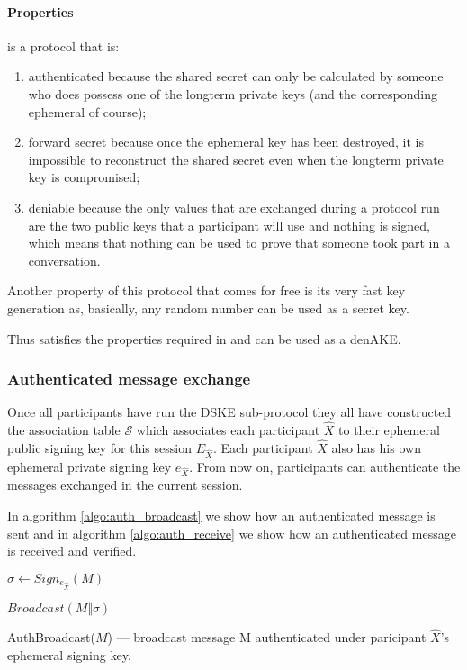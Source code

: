 \paragraph{Properties}
\tdhname is a protocol that is:

\begin{enumerate}

  \item authenticated because the shared secret can only be calculated by someone who does possess one of the longterm private keys (and the corresponding ephemeral of course);

  \item forward secret because once the ephemeral key has been destroyed, it is impossible to reconstruct the shared secret even when the longterm private key is compromised;

  \item deniable because the only values that are exchanged during a protocol run are the two public keys that a participant will use and nothing is signed, which means that nothing can be used to prove that someone took part in a conversation.

\end{enumerate}

Another property of this protocol that comes for free is its very fast key generation
as, basically, any random number can be used as a secret key.

Thus \tdhname satisfies the properties required in \cite{mpotr} and
can be used as a denAKE.

\subsubsection{Authenticated message exchange}
Once all participants have run the DSKE sub-protocol they all have constructed the association table $\mathcal{S}$ which associates each participant $\hat{X}$ to their ephemeral public signing key for this session $E_{\hat{X}}$. Each participant $\hat{X}$ also has his own ephemeral private signing key $e_{\hat{X}}$. From now on, participants can authenticate the messages exchanged in the current session.

In algorithm \ref{algo:auth_broadcast} we show how an authenticated message is sent and in algorithm \ref{algo:auth_receive} we show how an authenticated message is received and verified.

\begin{algorithm}[t]
  \Begin
  {		
	$\sigma \leftarrow Sign_{e_{\hat{X}}}(M)$
	
	$Broadcast(M \Vert \sigma)$
  }
  \caption{AuthBroadcast($M$) --- broadcast message M authenticated under paricipant $\hat{X}$'s ephemeral signing key.}
  \label{algo:auth_broadcast}
\end{algorithm}

